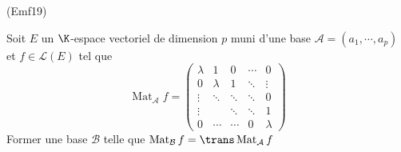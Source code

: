 \begin{tiny}(Emf19)\end{tiny} Soit $E$ un $\K$-espace vectoriel de dimension $p$ muni d'une base $\mathcal{A}=(a_1,\cdots,a_p)$ et $f\in\mathcal{L}(E)$ tel que
\begin{displaymath}
 \mathop{\mathrm{Mat}}_{\mathcal A}f
=\begin{pmatrix}
  \lambda & 1       & 0      & \cdots & 0      \\
  0       & \lambda & 1      & \ddots & \vdots \\
  \vdots  & \ddots  & \ddots & \ddots & 0       \\
  \vdots  &         & \ddots & \ddots & 1       \\
  0       & \cdots  & \cdots & 0      & \lambda
 \end{pmatrix}
\end{displaymath}
 Former une base $\mathcal{B}$ telle que $\mathop{\mathrm{Mat}}_{\mathcal B}f=\trans \mathop{\mathrm{Mat}}_{\mathcal A}f$